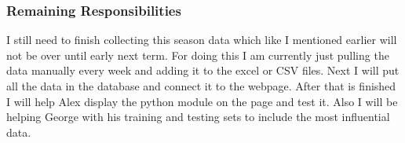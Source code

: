 \documentclass[letterpaper, 10pt,titlepage]{article}
\begin{document}
\subsubsection{Remaining Responsibilities}
I still need to finish collecting this season data which like I mentioned earlier will not be over until early next term. For doing this I am currently just pulling the data manually every week and adding it to the excel or CSV files. Next I will put all the data in the database and connect it to the webpage. After that is finished I will help Alex display the python module on the page and test it. Also I will be helping George with his training and testing sets to include the most influential data.
\end{document}
